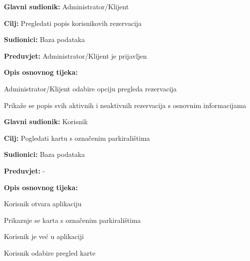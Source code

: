 \noindent {}
\begin{packed_item}
	
	\item \textbf{Glavni sudionik: } Administrator/Klijent
	\item \textbf{Cilj:} Pregledati popis korisnikovih rezervacija
	\item \textbf{Sudionici:} Baza podataka
	\item \textbf{Preduvjet:} Administrator/Klijent je prijavljen
	\item \textbf{Opis osnovnog tijeka:}
	
	\item[] \begin{packed_enum}
		
		\item Administrator/Klijent odabire opciju pregleda rezervacija
		\item Prikaže se popis svih aktivnih i neaktivnih rezervacija s osnovnim informacijama

	\end{packed_enum}
\end{packed_item}

\noindent {}
\begin{packed_item}
	
	\item \textbf{Glavni sudionik: } Korisnik
	\item \textbf{Cilj:} Pogledati kartu s označenim parkiralištima
	\item \textbf{Sudionici:} Baza podataka
	\item \textbf{Preduvjet:} -
	\item \textbf{Opis osnovnog tijeka:}
	
	\item[] \begin{packed_enum}
		
		\item Korisnik otvara aplikaciju
		\item Prikazuje se karta s označenim parkiralištima

	\end{packed_enum}
	
	\item[] \begin{packed_item}
	
		\item[1.a] Korisnik je već u aplikaciji
		\item[] \begin{packed_enum}
			
			\item Korisnik odabire pregled karte
			
	    \end{packed_enum}
    \end{packed_item}
\end{packed_item}

